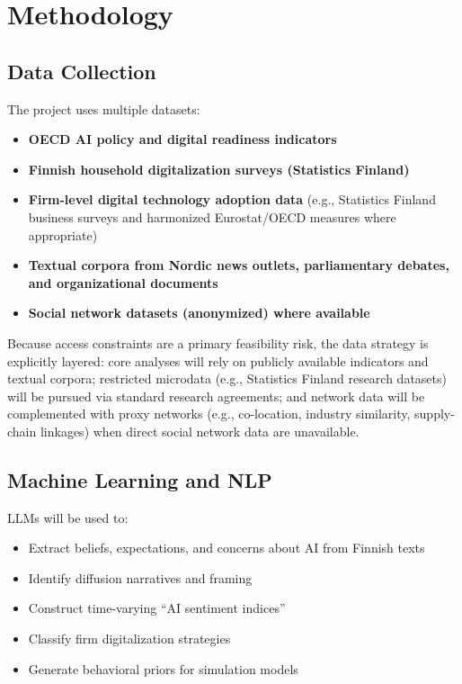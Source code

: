 \documentclass{nfr}
\begin{document}
\section{Methodology}

\subsection{Data Collection}

The project uses multiple datasets:

\begin{itemize}
\item \textbf{OECD AI policy and digital readiness indicators}
\item \textbf{Finnish household digitalization surveys (Statistics Finland)}
\item \textbf{Firm-level digital technology adoption data} (e.g., Statistics Finland business surveys and harmonized Eurostat/OECD measures where appropriate)
\item \textbf{Textual corpora from Nordic news outlets, parliamentary debates, and organizational documents}
\item \textbf{Social network datasets (anonymized) where available}
\end{itemize}

Because access constraints are a primary feasibility risk, the data strategy is explicitly layered: core analyses will rely on publicly available indicators and textual corpora; restricted microdata (e.g., Statistics Finland research datasets) will be pursued via standard research agreements; and network data will be complemented with proxy networks (e.g., co-location, industry similarity, supply-chain linkages) when direct social network data are unavailable.

\subsection{Machine Learning and NLP}

LLMs will be used to:

\begin{itemize}
\item Extract beliefs, expectations, and concerns about AI from Finnish texts
\item Identify diffusion narratives and framing
\item Construct time-varying “AI sentiment indices”
\item Classify firm digitalization strategies
\item Generate behavioral priors for simulation models
\end{itemize}
\end{document}
